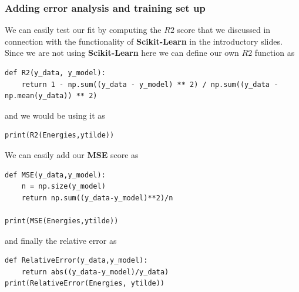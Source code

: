 \documentclass{beamer}
\begin{document}
\begin{frame}
\frametitle{Adding error analysis and training set up}

We can easily test our fit by computing the $R2$ score that we discussed in connection with the functionality of \textbf{Scikit-Learn} in the introductory slides.
Since we are not using \textbf{Scikit-Learn} here we can define our own $R2$ function as



\begin{verbatim}
def R2(y_data, y_model):
    return 1 - np.sum((y_data - y_model) ** 2) / np.sum((y_data - np.mean(y_data)) ** 2)

\end{verbatim}

and we would be using it as 


\begin{verbatim}
print(R2(Energies,ytilde))

\end{verbatim}


We can easily add our \textbf{MSE} score as






\begin{verbatim}
def MSE(y_data,y_model):
    n = np.size(y_model)
    return np.sum((y_data-y_model)**2)/n

print(MSE(Energies,ytilde))

\end{verbatim}

and finally the relative error as




\begin{verbatim}
def RelativeError(y_data,y_model):
    return abs((y_data-y_model)/y_data)
print(RelativeError(Energies, ytilde))

\end{verbatim}
\end{frame}
\end{document}
